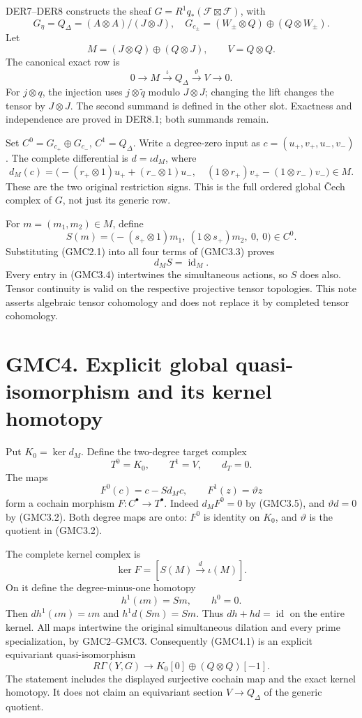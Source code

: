 DER7--DER8 constructs the sheaf
\(G=R^1q_*(\mathcal F\boxtimes\mathcal F)\), with \[
G_\eta=Q_\Delta=(A\otimes A)/(J\otimes J),
\quad G_{c_\pm}=(W_\pm\otimes Q)\oplus(Q\otimes W_\pm).
\tag{GMC3.1}
\] Let \[
M=(J\otimes Q)\oplus(Q\otimes J),\qquad V=Q\otimes Q.
\] The canonical exact row is \[
0\longrightarrow M\xrightarrow{\iota}Q_\Delta
\xrightarrow{\vartheta}V\longrightarrow0.
\tag{GMC3.2}
\] For \(j\otimes q\), the injection uses \(j\otimes\widetilde q\)
modulo \(J\otimes J\); changing the lift changes the tensor by
\(J\otimes J\). The second summand is defined in the other slot.
Exactness and independence are proved in DER8.1; both summands remain.

Set \(C^0=G_{c_+}\oplus G_{c_-}\), \(C^1=Q_\Delta\). Write a degree-zero
input as \(c=(u_+,v_+,u_-,v_-)\). The complete differential is
\(d=\iota d_M\), where \[
d_M(c)=\bigl(
-(r_+\otimes1)u_++(r_-\otimes1)u_-,\quad
(1\otimes r_+)v_+-(1\otimes r_-)v_-
\bigr)\in M.
\tag{GMC3.3}
\] These are the two original restriction signs. This is the full
ordered global Čech complex of \(G\), not just its generic row.

For \(m=(m_1,m_2)\in M\), define \[
S(m)=\bigl(-(s_+\otimes1)m_1,\ (1\otimes s_+)m_2,\ 0,\ 0\bigr)\in C^0.
\tag{GMC3.4}
\] Substituting (GMC2.1) into all four terms of (GMC3.3) proves \[
d_M S=\operatorname{id}_M.
\tag{GMC3.5}
\] Every entry in (GMC3.4) intertwines the simultaneous actions, so
\(S\) does also. Tensor continuity is valid on the respective projective
tensor topologies. This note asserts algebraic tensor cohomology and
does not replace it by completed tensor cohomology.

\section{GMC4. Explicit global quasi-isomorphism and its kernel
homotopy}\label{gmc4.-explicit-global-quasi-isomorphism-and-its-kernel-homotopy}

Put \(K_0=\ker d_M\). Define the two-degree target complex \[
T^0=K_0,\qquad T^1=V,\qquad d_T=0.
\] The maps \[
F^0(c)=c-Sd_Mc,\qquad F^1(z)=\vartheta z
\tag{GMC4.1}
\] form a cochain morphism \(F:C^\bullet\to T^\bullet\). Indeed
\(d_MF^0=0\) by (GMC3.5), and \(\vartheta d=0\) by (GMC3.2). Both degree
maps are onto: \(F^0\) is identity on \(K_0\), and \(\vartheta\) is the
quotient in (GMC3.2).

The complete kernel complex is \[
\ker F=[S(M)\xrightarrow{\ d\ }\iota(M)].
\tag{GMC4.2}
\] On it define the degree-minus-one homotopy \[
h^1(\iota m)=Sm,\qquad h^0=0.
\tag{GMC4.3}
\] Then \(dh^1(\iota m)=\iota m\) and \(h^1d(Sm)=Sm\). Thus
\(dh+hd=\operatorname{id}\) on the entire kernel. All maps intertwine
the original simultaneous dilation and every prime specialization, by
GMC2--GMC3. Consequently (GMC4.1) is an explicit equivariant
quasi-isomorphism \[
\boxed{R\Gamma(Y,G)\longrightarrow
K_0[0]\oplus(Q\otimes Q)[-1].}
\tag{GMC4.4}
\] The statement includes the displayed surjective cochain map and the
exact kernel homotopy. It does not claim an equivariant section
\(V\to Q_\Delta\) of the generic quotient.


